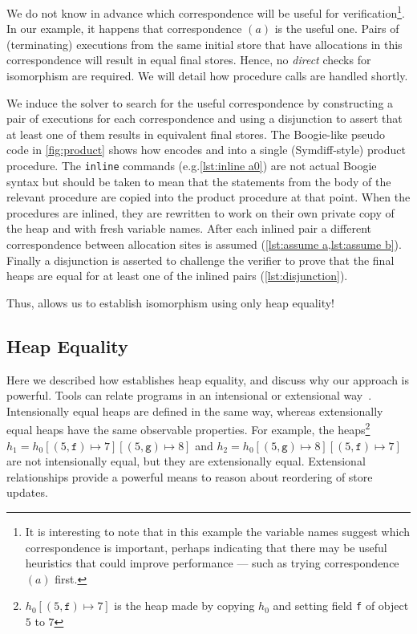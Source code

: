 \documentclass[runningheads,a4paper]{llncs}
\makeatletter
\newcommand*{\eg}{e.g.\@\xspace}
\makeatother
\begin{document}
We do not know in advance which correspondence will be useful for verification\footnote{It is interesting to note that in this example the variable names suggest which correspondence is important, perhaps indicating that there may be useful heuristics that could improve performance --- such as trying correspondence $(a)$ first.}. In our example, it happens that correspondence $(a)$ is the useful one. Pairs of (terminating) executions from the same initial store that have allocations in this correspondence will result in equal final stores. Hence, no \emph{direct} checks for isomorphism are required. We will detail how procedure calls are handled shortly.

We induce the solver to search for the useful correspondence by constructing a pair of executions for each correspondence and using a disjunction to assert that at least one of them results in equivalent final stores. The Boogie-like pseudo code in \cref{fig:product} shows how \tool{} encodes \copylr{} and \copyrl{} into a single (Symdiff-style) product procedure. The \texttt{inline} commands (\eg \cref{lst:inline a0}) are not actual Boogie syntax but should be taken to mean that the statements from the body of the relevant procedure are copied into the product procedure at that point. When the procedures are inlined, they are rewritten to work on their own private copy of the heap and with fresh variable names. After each inlined pair a different correspondence between allocation sites is assumed (\cref{lst:assume a,lst:assume b}). Finally a disjunction is asserted to challenge the verifier to prove that the final heaps are equal for at least one of the inlined pairs (\cref{lst:disjunction}).

Thus, \metho{} allows us to establish isomorphism using only heap equality! 

\subsection{Heap Equality}\label{sec:extensionality}

Here we described how \tool{} establishes heap equality, and discuss why our approach is powerful. Tools can relate programs in an intensional or extensional way~\cite{Benton2004}. Intensionally equal heaps are defined in the same way, whereas extensionally equal heaps have the same observable properties. For example, the heaps\footnote{$h_0[(5,\mathtt{f})\mapsto 7]$ is the heap made by copying $h_0$ and setting field \texttt{f} of object $5$ to $7$}  $h_1=h_0[(5,\mathtt{f}) \mapsto 7][(5,\mathtt{g}) \mapsto 8]$ and $h_2=h_0[(5,\mathtt{g}) \mapsto 8][(5,\mathtt{f}) \mapsto 7]$ are not intensionally equal, but they are extensionally equal. Extensional relationships provide a powerful means to reason about reordering of store updates.
\end{document}

